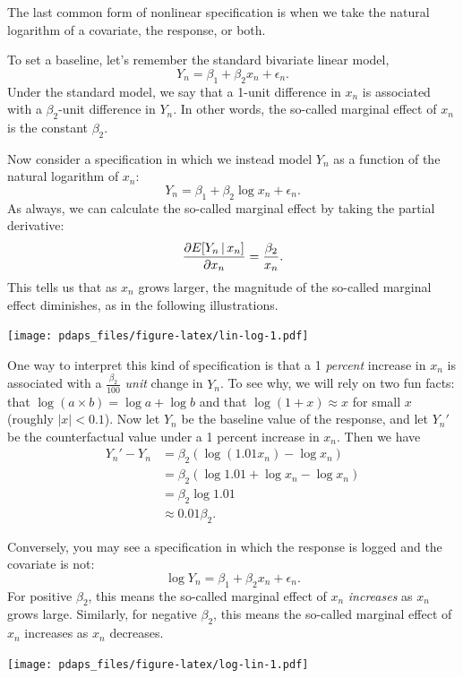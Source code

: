 \documentclass[12pt,oneside,openany]{book}
\begin{document}
The last common form of nonlinear specification is when we take the
natural logarithm of a covariate, the response, or both.

To set a baseline, let's remember the standard bivariate linear model,
\[
Y_n = \beta_1 + \beta_2 x_n + \epsilon_n.
\] Under the standard model, we say that a 1-unit difference in \(x_n\)
is associated with a \(\beta_2\)-unit difference in \(Y_n\). In other
words, the so-called marginal effect of \(x_n\) is the constant
\(\beta_2\).

Now consider a specification in which we instead model \(Y_n\) as a
function of the natural logarithm of \(x_n\): \[
Y_n = \beta_1 + \beta_2 \log x_n + \epsilon_n.
\] As always, we can calculate the so-called marginal effect by taking
the partial derivative: \[
\frac{\partial{}E[Y_n \,|\, x_n]}{\partial{}x_n} = \frac{\beta_2}{x_n}.
\] This tells us that as \(x_n\) grows larger, the magnitude of the
so-called marginal effect diminishes, as in the following illustrations.

\texttt{[image: pdaps\_files/figure-latex/lin-log-1.pdf]}

One way to interpret this kind of specification is that a 1
\emph{percent} increase in \(x_n\) is associated with a
\(\frac{\beta_2}{100}\) \emph{unit} change in \(Y_n\). To see why, we
will rely on two fun facts: that \(\log(a \times b) = \log a + \log b\)
and that \(\log(1 + x) \approx x\) for small \(x\) (roughly
\(|x| < 0.1\)). Now let \(Y_n\) be the baseline value of the response,
and let \(Y_n'\) be the counterfactual value under a 1 percent increase
in \(x_n\). Then we have \[
\begin{aligned}
Y_n' - Y_n
&= \beta_2 (\log(1.01 x_n) - \log x_n) \\
&= \beta_2 (\log 1.01 + \log x_n - \log x_n) \\
&= \beta_2 \log 1.01 \\
&\approx 0.01 \beta_2.
\end{aligned}
\]

Conversely, you may see a specification in which the response is logged
and the covariate is not: \[
\log Y_n = \beta_1 + \beta_2 x_n + \epsilon_n.
\] For positive \(\beta_2\), this means the so-called marginal effect of
\(x_n\) \emph{increases} as \(x_n\) grows large. Similarly, for negative
\(\beta_2\), this means the so-called marginal effect of \(x_n\)
increases as \(x_n\) decreases.

\texttt{[image: pdaps\_files/figure-latex/log-lin-1.pdf]}
\end{document}
